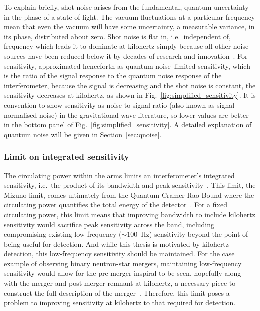 To explain briefly, shot noise arises from the fundamental, quantum uncertainty in the phase of a state of light. The vacuum fluctuations at a particular frequency mean that even the vacuum will have some uncertainty, a measurable variance, in its phase, distributed about zero. %
Shot noise is flat in, i.e.\ independent of, frequency which leads it to dominate at kilohertz simply because all other noise sources have been reduced below it by decades of research and innovation~\cite{}. For sensitivity, approximated henceforth as quantum noise--limited sensitivity, which is the ratio of the signal response to the quantum noise response of the interferometer, because the signal is decreasing and the shot noise is constant, the sensitivity decreases at kilohertz, as shown in Fig.~\ref{fig:simplified_sensitivity}. It is convention to show sensitivity as noise-to-signal ratio (also known as signal-normalised noise) in the gravitational-wave literature, so lower values are better in the bottom panel of Fig.~\ref{fig:simplified_sensitivity}.
A detailed explanation of quantum noise will be given in Section~\ref{sec:qnoise}.


\subsubsection{Limit on integrated sensitivity}

The circulating power within the arms limits an interferometer's integrated sensitivity, i.e.\ the product of its bandwidth and peak sensitivity~\cite{miaoFundamentalQuantumLimit2017}.
This limit, the Mizuno limit, comes ultimately from the Quantum Cramer-Rao Bound where the circulating power quantifies the total energy of the detector~\cite{}.
For a fixed circulating power, this limit means that improving bandwidth to include kilohertz sensitivity would sacrifice peak sensitivity across the band, including compromising existing low-frequency ($\sim100$~Hz) sensitivity beyond the point of being useful for detection. %
And while this thesis is motivated by kilohertz detection, this low-frequency sensitivity should be maintained. For the case example of observing binary neutron-star mergers, maintaining low-frequency sensitivity would allow for the pre-merger inspiral to be seen, hopefully along with the merger and post-merger remnant at kilohertz, a necessary piece to construct the full description of the merger~\cite{}.
Therefore, this limit poses a problem to improving sensitivity at kilohertz to that required for detection.


